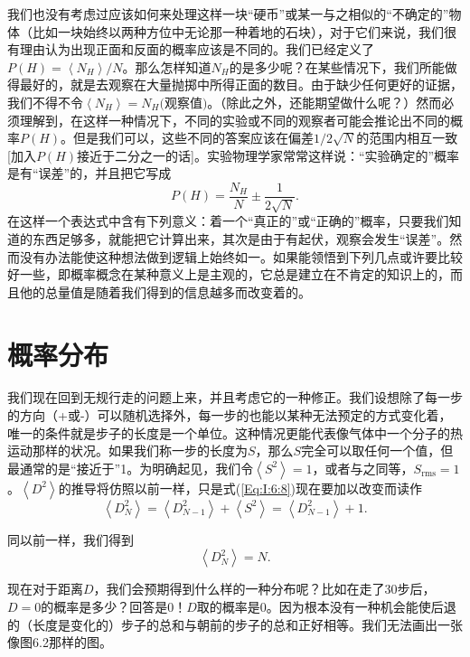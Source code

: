 我们也没有考虑过应该如何来处理这样一块“硬币”或某一与之相似的“不确定的”物体（比如一块始终以两种方位中无论那一种着地的石块），对于它们来说，我们很有理由认为出现正面和反面的概率应该是不同的。我们已经定义了$P(H)=\left < N_H \right >/N$。那么怎样知道$N_H$的是多少呢？在某些情况下，我们所能做得最好的，就是去观察在大量抛掷中所得正面的数目。由于缺少任何更好的证据，我们不得不令$\left < N_H \right > = N_H\textrm{(观察值)}$。（除此之外，还能期望做什么呢？）然而必须理解到，在这样一种情况下，不同的实验或不同的观察者可能会推论出不同的概率$P(H)$。但是我们可以，这些不同的答案应该在偏差$1/2\sqrt{N}$的范围内相互一致[加入$P(H)$接近于二分之一的话]。实验物理学家常常这样说：“实验确定的”概率是有“误差”的，并且把它写成
\begin{equation}
\label{Eq:I:6:14}
P(H)=\frac{N_H}{N}\pm\frac{1}{2\sqrt{N}}.
\end{equation}
在这样一个表达式中含有下列意义：着一个“真正的”或“正确的”概率，只要我们知道的东西足够多，就能把它计算出来，其次是由于有起伏，观察会发生“误差”。然而没有办法能使这种想法做到逻辑上始终如一。如果能领悟到下列几点或许要比较好一些，即概率概念在某种意义上是主观的，它总是建立在不肯定的知识上的，而且他的总量值是随着我们得到的信息越多而改变着的。


\section{概率分布}

我们现在回到无规行走的问题上来，并且考虑它的一种修正。我们设想除了每一步的方向（+或-）可以随机选择外，每一步的也能以某种无法预定的方式变化着，唯一的条件就是步子的长度是一个单位。这种情况更能代表像气体中一个分子的热运动那样的状况。如果我们称一步的长度为$S$，那么$S$完全可以取任何一个值，但最通常的是“接近于”1。为明确起见，我们令$\left < S^2 \right > = 1$，或者与之同等，$S_{\text{rms}}=1$。$\left < D^2 \right > $的推导将仿照以前一样，只是式(\ref{Eq:I:6:8})现在要加以改变而读作
\begin{equation}
\label{Eq:I:6:15}
\left < D_N^2 \right >=\left <D_{N-1}^2\right >+\left <S^2\right >=\left <D_{N-1}^2\right >+1.
\end{equation}

同以前一样，我们得到
\begin{equation}
\label{Eq:I:6:16}
\left <D_N^2\right > =N.
\end{equation}

现在对于距离$D$，我们会预期得到什么样的一种分布呢？比如在走了30步后，$D=0$的概率是多少？回答是$0$！$D$取的概率是0。因为根本没有一种机会能使后退的（长度是变化的）步子的总和与朝前的步子的总和正好相等。我们无法画出一张像图6.2那样的图。

